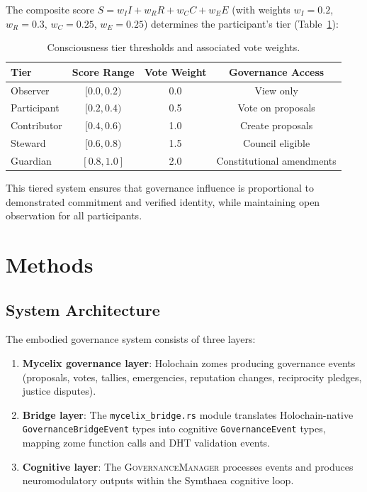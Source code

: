 \documentclass[11pt,a4paper]{article}
\begin{document}
The composite score $S = w_I I + w_R R + w_C C + w_E E$ (with weights $w_I = 0.2$, $w_R = 0.3$, $w_C = 0.25$, $w_E = 0.25$) determines the participant's tier (Table~\ref{tab:tiers}):

\begin{table}[h]
\centering
\caption{Consciousness tier thresholds and associated vote weights.}
\label{tab:tiers}
\begin{tabular}{lccc}
\toprule
\textbf{Tier} & \textbf{Score Range} & \textbf{Vote Weight} & \textbf{Governance Access} \\
\midrule
Observer  & $[0.0, 0.2)$ & 0.0 & View only \\
Participant & $[0.2, 0.4)$ & 0.5 & Vote on proposals \\
Contributor & $[0.4, 0.6)$ & 1.0 & Create proposals \\
Steward     & $[0.6, 0.8)$ & 1.5 & Council eligible \\
Guardian    & $[0.8, 1.0]$ & 2.0 & Constitutional amendments \\
\bottomrule
\end{tabular}
\end{table}

This tiered system ensures that governance influence is proportional to demonstrated commitment and verified identity, while maintaining open observation for all participants.

\section{Methods}
\label{sec:methods}

\subsection{System Architecture}

The embodied governance system consists of three layers:

\begin{enumerate}
  \item \textbf{Mycelix governance layer}: Holochain zomes producing governance events (proposals, votes, tallies, emergencies, reputation changes, reciprocity pledges, justice disputes).
  \item \textbf{Bridge layer}: The \texttt{mycelix\_bridge.rs} module translates Holochain-native \texttt{GovernanceBridgeEvent} types into cognitive \texttt{GovernanceEvent} types, mapping zome function calls and DHT validation events.
  \item \textbf{Cognitive layer}: The \textsc{GovernanceManager} processes events and produces neuromodulatory outputs within the Symthaea cognitive loop.
\end{enumerate}
\end{document}
